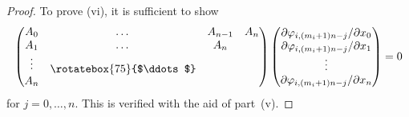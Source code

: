 \documentclass[pdftex]{sigma}
\numberwithin{equation}{section}
\begin{document}
\begin{proof}
To prove (vi), it is suf\/f\/icient to show
\begin{gather*}
\left(
\begin{matrix}
A_0 & \dots & A_{n-1} & A_n \\
A_1 & \dots & A_n & \\
\vdots & \raisebox{-0.1cm}{\rotatebox{75}{$\ddots$}} & & \\
A_n & & &
\end{matrix}
\right)
\left(
\begin{matrix}
\partial \varphi _{i,(m_i+1)n-j}/\partial x_0 \\
\partial \varphi _{i,(m_i+1)n-j}/\partial x_1 \\
\vdots \\
\partial \varphi _{i,(m_i+1)n-j}/\partial x_n
\end{matrix}
\right) = 0
\end{gather*}
for $j=0,\dots ,n$. This is verif\/ied with the aid of part~(v).
\end{proof}
\end{document}
